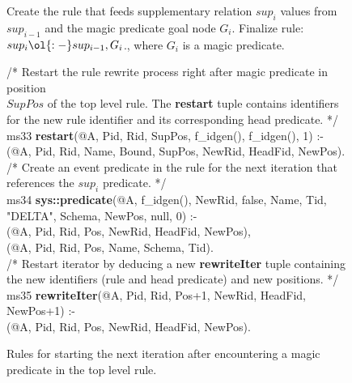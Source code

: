 \begin{appendix}
\begin{figure}[!t]
\begin{boxedminipage}{\linewidth}
\end{boxedminipage}
\caption{\label{ch:evita:fig:mpgoal} Create the rule that feeds supplementary
relation $sup_i$ values from $sup_{i-1}$ and the magic predicate goal node $G_i$.
Finalize rule: $sup_i \ol{:-} sup_{i-1}, G_i$., where $G_i$ is a magic predicate. }
\end{figure}

\begin{figure}[!t]
\ssp
\centering
\begin{boxedminipage}{\linewidth}
/* Restart the rule rewrite process right after magic predicate in position  \\
$SupPos$ of the top level rule. The {\bf restart} tuple contains identifiers  \\
for the new rule identifier and its corresponding head predicate. */ \\
ms33 {\bf restart}(@A, Pid, Rid, SupPos, f\_idgen(), f\_idgen(), 1) :- \\
(@A, Pid, Rid, Name, Bound, SupPos, NewRid, HeadFid, NewPos). \\
	
/* Create an event predicate in the rule for the next iteration that  \\
references the $sup_i$ predicate. */ \\
ms34 {\bf sys::predicate}(@A, f\_idgen(), NewRid, false, Name, Tid, "DELTA", Schema, NewPos, null, 0) :- \\
(@A, Pid, Rid, Pos, NewRid, HeadFid, NewPos), \\
(@A, Pid, Rid, Pos, Name, Schema, Tid). \\
	
/* Restart iterator by deducing a new {\bf rewriteIter} tuple containing \\
the new identifiers (rule and head predicate) and new positions. */ \\
ms35 {\bf rewriteIter}(@A, Pid, Rid, Pos+1, NewRid, HeadFid, NewPos+1) :- \\
(@A, Pid, Rid, Pos, NewRid, HeadFid, NewPos). \\

\end{boxedminipage}
\caption{\label{ch:evita:fig:mpgoal}Rules for starting the next iteration after
encountering a magic predicate in the top level rule. }
\end{figure}

\end{appendix}

